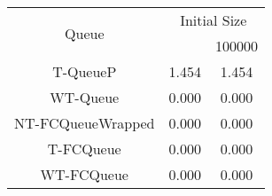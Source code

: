 \begin{tabular}{|c|c|c|}
\hline
\multirow{2}{*}{Queue} & \multicolumn{2}{c|}{Initial Size}\\\cline{2-3}& \qquad 10000 \qquad\quad & 100000\\
\hline
\hline
T-QueueP & 1.454 & 1.454\\
WT-Queue & 0.000 & 0.000\\
NT-FCQueueWrapped & 0.000 & 0.000\\
T-FCQueue & 0.000 & 0.000\\
WT-FCQueue & 0.000 & 0.000\\
\hline\end{tabular}
